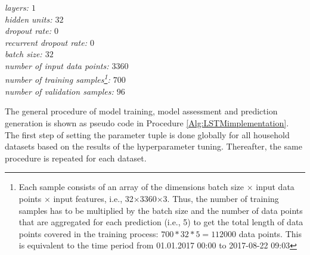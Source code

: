 \indent\textit{layers: $1$\\
\indent hidden units: $32$\\
\indent dropout rate: $0$\\
\indent recurrent dropout rate: $0$\\
\indent batch size: $32$\\
\indent number of input data points: $3360$\\
\indent number of training samples\footnote{Each sample consists of an array of the dimensions batch size $\times$ input data points $\times$ input features, i.e., 32$\times$3360$\times$3. Thus, the number of training samples has to be multiplied by the batch size and the number of data points that are aggregated for each prediction (i.e., 5) to get the total length of data points covered in the training process: $700*32*5=112000$ data points. This is equivalent to the time period from 01.01.2017 00:00 to 2017-08-22 09:03}: $700$ \\
\indent number of validation samples: $96$}

The general procedure of model training, model assessment and prediction generation is shown as pseudo code in Procedure \ref{Alg:LSTMimplementation}. The first step of setting the parameter tuple is done globally for all household datasets based on the results of the hyperparameter tuning. Thereafter, the same procedure is repeated for each dataset.

